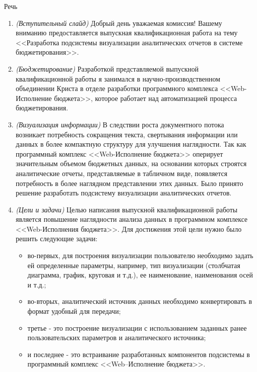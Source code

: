 \documentclass[a4paper]{extarticle}
\begin{document}
\begin{center}
    \Large Речь
\end{center}

\begin{enumerate}[label=\textbf{\arabic*})]
    \item \textit{(Вступительный слайд)} Добрый день уважаемая комиссия! Вашему вниманию пре\-доставляется выпускная квалификационная работа на тему <<Разработка подсистемы визуализации аналитических отчетов в системе бюджетирования>>.
    \item \textit{(Бюджетирование)} Разработкой представляемой выпускной квалификационной работы я занимался в научно-произ\-водственном объединении Криста в отделе разработки программного комплекса \-<<Web-Исполнение бюджета>>, которое работает над автоматизацией процесса бюджетирования. %
    \item \textit{(Визуализация информации)} В следствии роста документного потока возникает потребность сокращения текста, свертывания информации или данных в более компактную структуру для улучшения наглядности. Так как программный комплекс <<Web-Исполнение бюджета>> оперирует значительным объемом бюджетных данных, на основании которых строятся аналитические отчеты, представляемые в табличном виде, появляется потребность в более наглядном представлении этих данных. Было принято решение разработать подсистему визуализации аналитических отчетов.
    \item \textit{(Цели и задачи)} Целью написания выпускной квалификационной работы является повышение наглядности анализа данных в программном комплексе <<Web-Исполнения бюджета>>. Для достижения этой цели нужно было решить следующие задачи:
        \begin{itemize}
            \item во-первых, для построения визуализации пользователю необходимо задать ей определенные параметры, например, тип визуализации (столбчатая диаграмма, график, круговая и т.д.), ее наименование, наименования осей и т.д.;
            \item во-вторых, аналитический источник данных необходимо конвертировать в формат удобный для передачи;
            \item третье - это построение визуализации с использованием заданных ранее пользовательских параметров и аналитического источника;
            \item и последнее - это встраивание разработанных компонентов подсистемы в программный комплекс <<Web–Исполнение бюджета>>.

\end{itemize}
\end{enumerate}
\end{document}
